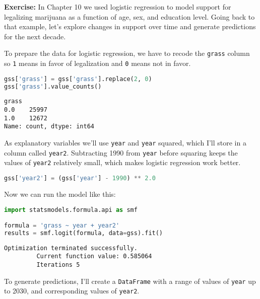 \pagebreak

\textbf{Exercise:} In Chapter 10 we used logistic regression to model
support for legalizing marijuana as a function of age, sex, and
education level. Going back to that example, let's explore changes in
support over time and generate predictions for the next decade.

To prepare the data for logistic regression, we have to recode the
\passthrough{\lstinline!grass!} column so \passthrough{\lstinline!1!}
means in favor of legalization and \passthrough{\lstinline!0!} means not
in favor.

\begin{lstlisting}[language=Python,style=source]
gss['grass'] = gss['grass'].replace(2, 0)
gss['grass'].value_counts()
\end{lstlisting}

\begin{lstlisting}[style=output]
grass
0.0    25997
1.0    12672
Name: count, dtype: int64
\end{lstlisting}

As explanatory variables we'll use \passthrough{\lstinline!year!} and
\passthrough{\lstinline!year!} squared, which I'll store in a column
called \passthrough{\lstinline!year2!}. Subtracting 1990 from
\passthrough{\lstinline!year!} before squaring keeps the values of
\passthrough{\lstinline!year2!} relatively small, which makes logistic
regression work better.

\begin{lstlisting}[language=Python,style=source]
gss['year2'] = (gss['year'] - 1990) ** 2.0
\end{lstlisting}

Now we can run the model like this:

\begin{lstlisting}[language=Python,style=source]
import statsmodels.formula.api as smf

formula = 'grass ~ year + year2'
results = smf.logit(formula, data=gss).fit()
\end{lstlisting}

\begin{lstlisting}[style=output]
Optimization terminated successfully.
         Current function value: 0.585064
         Iterations 5
\end{lstlisting}

To generate predictions, I'll create a
\passthrough{\lstinline!DataFrame!} with a range of values of
\passthrough{\lstinline!year!} up to 2030, and corresponding values of
\passthrough{\lstinline!year2!}.

